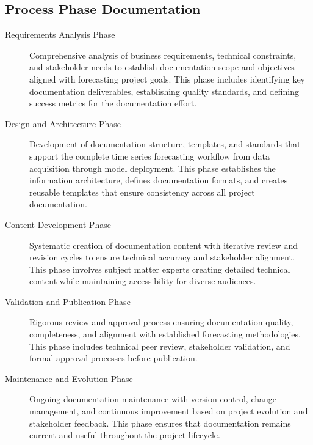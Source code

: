 \begin{center}
\end{center}


\subsection{Process Phase Documentation}

\begin{description}
	\item[Requirements Analysis Phase] Comprehensive analysis of business requirements, technical constraints, and stakeholder needs to establish documentation scope and objectives aligned with forecasting project goals. This phase includes identifying key documentation deliverables, establishing quality standards, and defining success metrics for the documentation effort.
	
	\item[Design and Architecture Phase] Development of documentation structure, templates, and standards that support the complete time series forecasting workflow from data acquisition through model deployment. This phase establishes the information architecture, defines documentation formats, and creates reusable templates that ensure consistency across all project documentation.
	
	\item[Content Development Phase] Systematic creation of documentation content with iterative review and revision cycles to ensure technical accuracy and stakeholder alignment. This phase involves subject matter experts creating detailed technical content while maintaining accessibility for diverse audiences.
	
	\item[Validation and Publication Phase] Rigorous review and approval process ensuring documentation quality, completeness, and alignment with established forecasting methodologies. This phase includes technical peer review, stakeholder validation, and formal approval processes before publication.
	
	\item[Maintenance and Evolution Phase] Ongoing documentation maintenance with version control, change management, and continuous improvement based on project evolution and stakeholder feedback. This phase ensures that documentation remains current and useful throughout the project lifecycle.
	\end{description}
		
